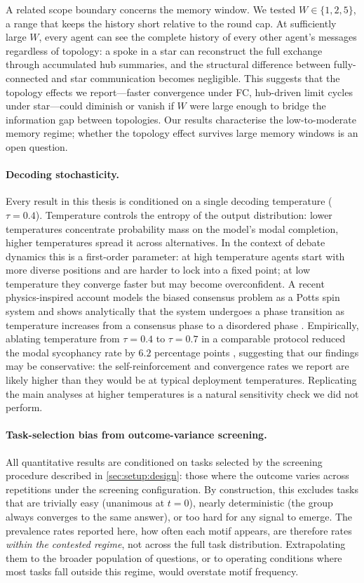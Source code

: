 A related scope boundary concerns the memory window. We tested $W \in \{1, 2, 5\}$,
a range that keeps the history short relative to the round cap. At sufficiently
large $W$, every agent can see the complete history of every other agent's messages
regardless of topology: a spoke in a star can reconstruct the full exchange through
accumulated hub summaries, and the structural difference between fully-connected and
star communication becomes negligible. This suggests that the topology effects we
report---faster convergence under FC, hub-driven limit cycles under star---could
diminish or vanish if $W$ were large enough to bridge the information gap between
topologies. Our results characterise the low-to-moderate memory regime; whether
the topology effect survives large memory windows is an open question.

\paragraph{Decoding stochasticity.}
Every result in this thesis is conditioned on a single decoding temperature
($\tau = 0.4$). Temperature controls the entropy of the output distribution: lower
temperatures concentrate probability mass on the model's modal completion, higher
temperatures spread it across alternatives. In the context of debate dynamics
this is a first-order parameter: at high temperature agents start with more
diverse positions and are harder to lock into a fixed point; at low temperature
they converge faster but may become overconfident. A recent physics-inspired
account models the biased consensus problem as a Potts spin system and shows
analytically that the system undergoes a phase transition as temperature increases
from a consensus phase to a disordered phase \citep{okawa2026biasedconsensus}.
Empirically, ablating temperature from $\tau = 0.4$ to $\tau = 0.7$ in a comparable
protocol reduced the modal sycophancy rate by $6.2$ percentage points
\citep{bertalanic2026costofconsensus}, suggesting that our findings may be
conservative: the self-reinforcement and convergence rates we report are likely
higher than they would be at typical deployment temperatures. Replicating the
main analyses at higher temperatures is a natural sensitivity check we did not
perform.

\paragraph{Task-selection bias from outcome-variance screening.}
All quantitative results are conditioned on tasks selected by the screening
procedure described in \autoref{sec:setup:design}: those where the outcome
varies across repetitions under the screening configuration.
By construction, this excludes tasks that are trivially easy (unanimous at $t=0$),
nearly deterministic (the group always converges to the same answer), or too hard
for any signal to emerge.
The prevalence rates reported here, how often each motif appears, are therefore
rates \emph{within the contested regime}, not across the full task distribution.
Extrapolating them to the broader population of questions, or to operating
conditions where most tasks fall outside this regime, would overstate motif frequency.

